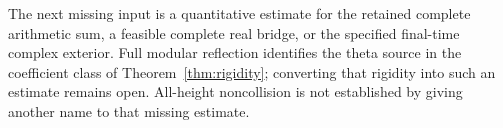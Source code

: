 The next missing input is a quantitative estimate for the retained
complete arithmetic sum, a feasible complete real bridge, or the
specified final-time complex exterior. Full modular reflection
identifies the theta source in the coefficient class of
Theorem~\ref{thm:rigidity}; converting that rigidity into such an
estimate remains open. All-height noncollision is not established
by giving another name to that missing estimate.
